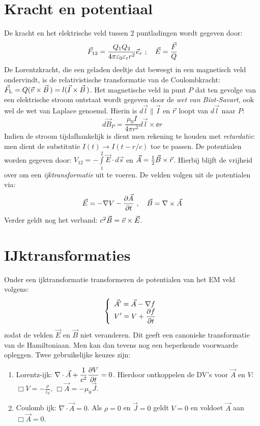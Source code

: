 \documentclass[twoside]{report}
\begin{document}
\section{Kracht en potentiaal}
De kracht en het elektrische veld tussen 2 puntladingen wordt gegeven door:
\[
\vec{F}_{12}=\frac{Q_1Q_2}{4\pi\varepsilon_0\varepsilon_{\rm r}r^2}\vec{e}_{r}
~;~~~\vec{E}=\frac{\vec{F}}{Q}
\]
De Lorentzkracht, die een geladen deeltje dat beweegt in een magnetisch veld
ondervindt, is de relativistische transformatie van de Coulombkracht:
$\vec{F}_{\rm L}=Q(\vec{v}\times\vec{B}\,)=l(\vec{I}\times\vec{B}\,)$.
\npar
Het magnetische veld in punt $P$ dat ten gevolge van een elektrische stroom
ontstaat wordt gegeven door de {\it wet van Biot-Savart}, ook wel de wet van
Laplace genoemd. Hierin is $d\vec{l}\parallel\vec{I}$ en $\vec{r}$ loopt van
$d\vec{l}$ naar $P$:
\[
d\vec{B}_P=\frac{\mu_0I}{4\pi r^2}d\vec{l}\times\ee{r}
\]
Indien de stroom tijdafhankelijk is dient men rekening te houden met
{\it retardatie}: men dient de substitutie $I(t)\rightarrow I(t-r/c)$ toe te
passen.
\npar
De potentialen worden gegeven door:
$\displaystyle V_{12}=-\int\limits_1^2\vec{E}\cdot d\vec{s}$ en
$\vec{A}=\mbox{$\frac{1}{2}$}\vec{B}\times\vec{r}$.
\npar
Hierbij blijft de vrijheid over om een {\it ijktransformatie} uit te voeren.
De velden volgen uit de potentialen via:
\[
\vec{E}=-\nabla V-\frac{\partial \vec{A}}{\partial t}~,~~~\vec{B}=\nabla\times\vec{A}
\]
Verder geldt nog het verband: $c^2\vec{B}=\vec{v}\times\vec{E}$.

\section{IJktransformaties}
Onder een ijktransformatie transformeren de potentialen van het EM veld
volgens:
\[
\left\{\begin{array}{l}
\vec{A}'=\vec{A}-\nabla f\\
\displaystyle V'=V+\frac{\partial f}{\partial t}
\end{array}\right.
\]
zodat de velden $\vec{E}$ en $\vec{B}$ niet veranderen. Dit geeft een
canonieke transformatie van de Hamiltoniaan. Men kan dan tevens nog een
beperkende voorwaarde opleggen. Twee gebruikelijke keuzes zijn:
\begin{enumerate}
\item Lorentz-ijk: $\displaystyle\nabla\cdot\vec{A}+\frac{1}{c^2}\frac{\partial V}{\partial t}=0$.
      Hierdoor ontkoppelen de DV's voor $\vec{A}$ en $V$:
      $\displaystyle\Box V=-\frac{\rho}{\varepsilon_0}$, $\Box\vec{A}=-\mu_0\vec{J}$.
\item Coulomb ijk: $\nabla\cdot\vec{A}=0$. Als $\rho=0$ en $\vec{J}=0$ geldt
      $V=0$ en voldoet $\vec{A}$ aan $\Box\vec{A}=0$.
\end{enumerate}
\end{document}
